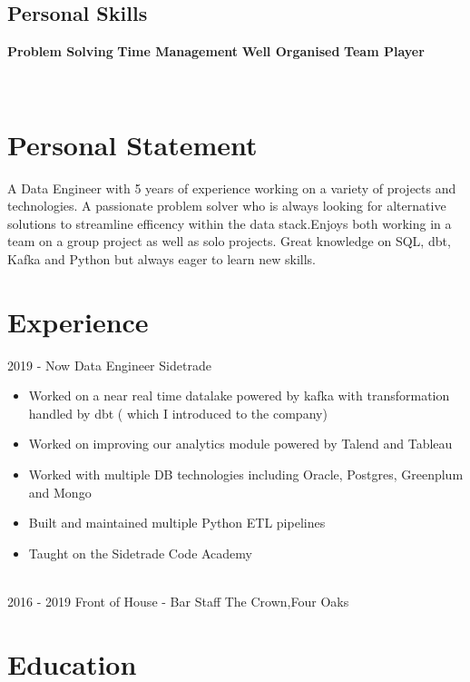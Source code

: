 \documentclass[]{friggeri-cv}
\begin{document}
\begin{aside}
  \section{Personal Skills}
    \textbf{Problem Solving}
    \textbf{Time Management}
    \textbf{Well Organised}
    \textbf{Team Player}    
    ~
\end{aside}
~
\section{Personal Statement}
A Data Engineer with 5 years of experience working on a variety of projects and technologies. A passionate problem solver who is always looking for alternative solutions to streamline efficency within the data stack.Enjoys both working in a team on a group project as well as solo projects. Great knowledge on SQL, dbt, Kafka and Python but always eager to learn new skills. 
\section{Experience}
\begin{entrylist}
  \entry
  {2019 - Now}
  {Data Engineer}
  {Sidetrade}
  {  
  \begin{itemize}
    \item Worked on a near real time datalake powered by kafka with transformation handled by dbt ( which I introduced to the company) 
    \item Worked on improving our analytics module powered by Talend and Tableau
    \item Worked with multiple DB technologies including Oracle, Postgres, Greenplum and Mongo
    \item Built and maintained multiple Python ETL pipelines  
    \item Taught on the Sidetrade Code Academy 
  \end{itemize}}
  \\
  \entry
  {2016 - 2019}
  {Front of House - Bar Staff}
  {The Crown,Four Oaks}

\end{entrylist}

\section{Education}
\end{document}
